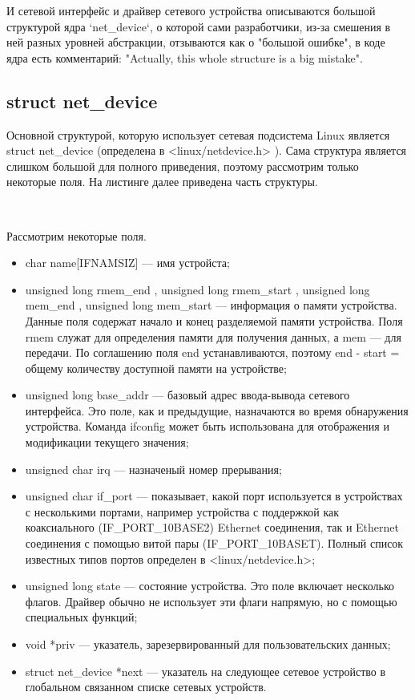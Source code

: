 \documentclass[14pt, a4paper]{extarticle}
\begin{document}
И сетевой интерфейс и драйвер сетевого устройства описываются большой структурой ядра `net\_device`, о которой сами разработчики, из-за смешения в ней разных уровней абстракции, отзываются как о "большой ошибке", в коде ядра есть комментарий: "Actually, this whole structure is a big mistake".



\subsection{struct net\_device}
Основной структурой, которую использует сетевая подсистема Linux является struct net\_device (определена в <linux/netdevice.h> \cite{netdevice}). Сама структура является слишком большой для полного приведения, поэтому рассмотрим только некоторые поля.
На листинге далее приведена часть структуры.
\begin{lstlisting}[caption=net\_device]
	
\end{lstlisting}

Рассмотрим некоторые поля.
\begin{itemize}
\item char name[IFNAMSIZ] --- имя устройста;

\item unsigned long rmem\_end , unsigned long rmem\_start , unsigned long mem\_end , unsigned long mem\_start --- информация о памяти устройства. Данные поля содержат начало и конец разделяемой памяти устройства. Поля rmem служат для определения памяти для получения данных, а mem --- для передачи. По соглашению поля end устанавливаются, поэтому end - start = общему количеству доступной памяти на устройстве;

\item unsigned long base\_addr --- базовый адрес ввода-вывода сетевого интерфейса. Это поле, как и предыдущие, назначаются во время обнаружения устройства. Команда ifconfig может быть использована для отображения и модификации текущего значения;

\item unsigned char irq --- назначеный номер прерывания;

\item unsigned char if\_port --- показывает, какой порт используется в устройствах с несколькими портами, например устройства с поддержкой как коаксиального (IF\_PORT\_10BASE2) Ethernet соединения, так и Ethernet соединения с помощью витой пары (IF\_PORT\_10BASET). Полный список известных типов портов определен в <linux/netdevice.h>;

\item unsigned long state --- состояние устройства. Это поле включает несколько флагов. Драйвер обычно не использует эти флаги напрямую, но с помощью специальных функций;

\item void *priv --- указатель, зарезервированный для пользовательских данных;

\item struct net\_device *next --- указатель на следующее сетевое устройство в глобальном связанном списке сетевых устройств.

\end{itemize}
\end{document}
